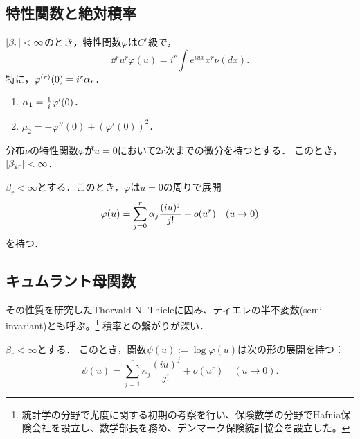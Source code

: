 \documentclass[uplatex,dvipdfmx]{jsreport}
\begin{document}
\subsection{特性関数と絶対積率}

\begin{proposition}
    $\lvert\beta_r\rvert<\infty$のとき，特性関数$\varphi$は$C^r$級で，
    \[\dd{^r}{u^r}\varphi(u)=i^r\int e^{iux}x^r\nu(dx).\]
    特に，$\varphi^{(r)}(0)=i^r\alpha_r$．
\end{proposition}

\begin{corollary}[平均と分散の特性関数による特徴付け]\mbox{}\label{cor-mean-and-variance-in-terms-of-characteristic-function}
    \begin{enumerate}
        \item $\alpha_1=\frac{1}{i}\varphi'(0)$．
        \item $\mu_2=-\varphi''(0)+(\varphi'(0))^2$．
    \end{enumerate}
\end{corollary}

\begin{proposition}
    分布$\nu$の特性関数$\varphi$が$u=0$において$2r$次までの微分を持つとする．
    このとき，$\lvert\beta_{2r}\rvert<\infty$．
\end{proposition}

\begin{proposition}
    $\beta_r<\infty$とする．このとき，$\varphi$は$u=0$の周りで展開
    \[\varphi(u)=\sum^r_{j=0}\alpha_j\frac{(iu)^j}{j!}+o(u^r)\quad(u\to0)\]
    を持つ．
\end{proposition}

\subsection{キュムラント母関数}

\begin{tcolorbox}[colframe=ForestGreen, colback=ForestGreen!10!white,breakable,colbacktitle=ForestGreen!40!white,coltitle=black,fonttitle=\bfseries\sffamily,
title=]
    その性質を研究したThorvald N. Thieleに因み、ティエレの半不変数(semi-invariant)とも呼ぶ。\footnote{統計学の分野で尤度に関する初期の考察を行い、保険数学の分野でHafnia保険会社を設立し、数学部長を務め、デンマーク保険統計協会を設立した。}
    積率との繋がりが深い．
\end{tcolorbox}

\begin{proposition}
    $\beta_r<\infty$とする．
    このとき，関数$\psi(u):=\log\varphi(u)$は次の形の展開を持つ：
    \[\psi(u)=\sum^r_{j=1}\kappa_j\frac{(iu)^j}{j!}+o(u^r)\quad(u\to0).\]
\end{proposition}
\end{document}
